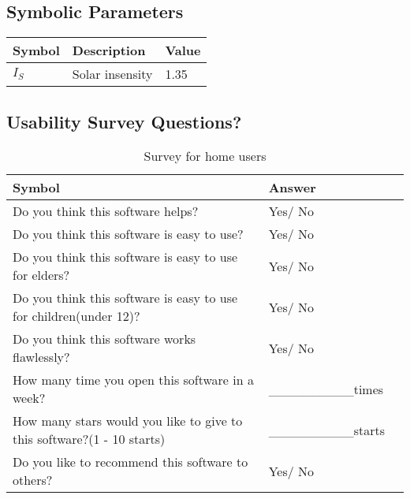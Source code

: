 \documentclass[12pt, titlepage]{article}
\begin{document}
\subsection{Symbolic Parameters}

  \noindent \begin{tabular}{l l l} 
    \toprule		
    \textbf{Symbol} & \textbf{Description} & \textbf{Value}\\
    \midrule 
    $I_{S}$ & Solar insensity &1.35  \\
    \bottomrule
  \end{tabular}


 \subsection{Usability Survey Questions?}


\begin{table}[h!]
  \noindent \begin{tabular}{l l l} 
    \toprule		
    \textbf{Symbol} & \textbf{Answer} \\
    \midrule 
    Do you think this software helps? & Yes/ No  \\
    Do you think this software is easy to use? & Yes/ No  \\
    Do you think this software is easy to use for elders? & Yes/ No  \\
    Do you think this software is easy to use for children(under 12)? & Yes/ No  \\
    Do you think this software works flawlessly? & Yes/ No  \\
    How many time you open this software in a week? & \_\_\_\_\_\_\_\_\_times  \\
	 How many stars  would you like to give to this software?(1 - 10 starts) & \_\_\_\_\_\_\_\_\_starts  \\
    Do you like to recommend  this software to others? & Yes/ No  \\
    \bottomrule
  \end{tabular}
  \caption{Survey for home users}
\end{table}
\end{document}
